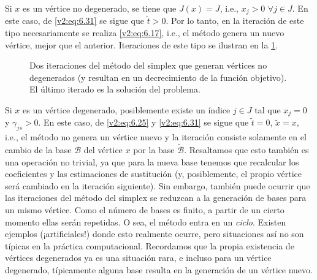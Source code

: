 Si $x$ es un vértice no degenerado, se tiene que $J(x) = J$, i.e., $x_j > 0$ $\forall j \in J$. En este caso, de \eqref{v2:eq:6.31} se sigue que $\tilde{t} > 0$. Por lo tanto, en la iteración de este tipo necesariamente se realiza \eqref{v2:eq:6.17}, i.e., el método genera un nuevo vértice, mejor que el anterior. Iteraciones de este tipo se ilustran en la \cref{v2:fig:6.1.3}.

\begin{figure}[htpb]
    \centering
    \caption{Dos iteraciones del método del simplex que generan vértices no degenerados (y resultan en un decrecimiento de la función objetivo). El último iterado es la solución del problema.}
    \label{v2:fig:6.1.3}
\end{figure}

Si $x$ es un vértice degenerado, posiblemente existe un índice $j \in J$ tal que $x_j = 0$ y $\gamma_{js} > 0$. En este caso, de \eqref{v2:eq:6.25} y \eqref{v2:eq:6.31} se sigue que $\tilde{t} = 0$, $\tilde{x} = x$, i.e., el método no genera un vértice nuevo y la iteración consiste solamente en el cambio de la base $\mathcal{B}$ del vértice $x$ por la base $\tilde{\mathcal{B}}$. Resaltamos que esto también es una operación no trivial, ya que para la nueva base tenemos que recalcular los coeficientes y las estimaciones de sustitución (y, posiblemente, el propio vértice será cambiado en la iteración siguiente). Sin embargo, también puede ocurrir que las iteraciones del método del simplex se reduzcan a la generación de bases para un mismo vértice. Como el número de bases es finito, a partir de un cierto momento ellas serán repetidas. O sea, el método entra en un \textit{ciclo}. Existen ejemplos (¡artificiales!) donde esto realmente ocurre, pero situaciones así no son típicas en la práctica computacional. Recordamos que la propia existencia de vértices degenerados ya es una situación rara, e incluso para un vértice degenerado, típicamente alguna base resulta en la generación de un vértice nuevo.

